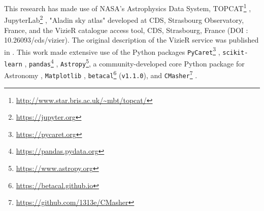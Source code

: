 \documentclass{aa}
\begin{document}
\begin{acknowledgements}
This research has made use of NASA's Astrophysics Data System, TOPCAT\footnote{\url{http://www.star.bris.ac.uk/~mbt/topcat/}} \citep{2005ASPC..347...29T}, JupyterLab\footnote{\url{https://jupyter.org}} \citep{jupyter}, "Aladin sky atlas" \citep[\texttt{v11.0.24};][]{2000A&AS..143...33B} developed at CDS, Strasbourg Observatory, France, and the VizieR catalogue access tool, CDS, Strasbourg, France (DOI : 10.26093/cds/vizier). The original description of the VizieR service was published in \cite{vizier}.
This work made extensive use of the Python packages \texttt{PyCaret}\footnote{\url{https://pycaret.org}} \citep[\texttt{v2.3.10};][]{PyCaret}, \texttt{scikit-learn} \citep[\texttt{v0.23.2};][]{scikit-learn}, \texttt{pandas}\footnote{\url{https://pandas.pydata.org}} \citep[\texttt{v1.4.2};][]{pandas}, \texttt{Astropy}\footnote{\url{https://www.astropy.org}}, a community-developed core Python package for Astronomy \citep[\texttt{v5.0};][]{astropy:2013, astropy:2018, 2022ApJ...935..167A}, \texttt{Matplotlib} \citep[\texttt{v3.5.1};][]{Hunter:2007}, \texttt{betacal}\footnote{\url{https://betacal.github.io}} (\texttt{v1.1.0}), and \texttt{CMasher}\footnote{\url{https://github.com/1313e/CMasher}} \citep[\texttt{v1.6.3};][]{2020JOSS....5.2004V}.
\end{acknowledgements}

%
%


\end{document}

